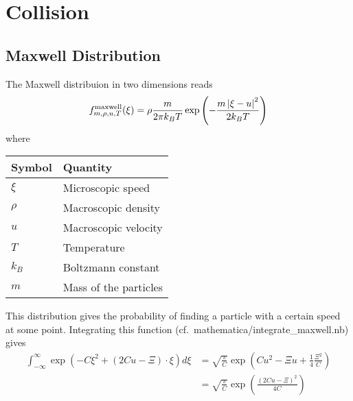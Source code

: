 \documentclass{article}
\begin{document}
\section{Collision}
\label{sec:Collision}

\subsection{Maxwell Distribution}
\label{sub:Maxwell Distribution}
The Maxwell distribuion in two dimensions reads
\begin{equation}
  \label{eq:maxwell distribution raw}
  f_{m, \rho, u, T}^{\text{maxwell}}(\xi) = \rho \frac{m}{2\pi k_B T} \exp \left( - \frac{m\left| \xi-u \right|^2}{2 k_B T}\right)
\end{equation}
where
\begin{center}
  \begin{tabular}{@{}ll@{}}
    \toprule
    Symbol & Quantity  \\
    \midrule
    $\xi$  & Microscopic speed  \\
    $\rho$ & Macroscopic density     \\
    $u$    & Macroscopic velocity   \\
    $T$    & Temperature   \\
    $k_B$  & Boltzmann constant \\
    $m$    & Mass of the particles   \\
    \bottomrule
  \end{tabular}
\end{center}
This distribution gives the probability of finding a particle with a certain speed at some point.
Integrating this function (cf.\ mathematica/integrate\_maxwell.nb) gives
\begin{equation}
  \label{eq:integrate exponential sage}
  \begin{aligned}
    \int_{-\infty}^{\infty} \exp \left(-C \xi^2 + (2Cu - \Xi)\cdot\xi \right) d\xi
    & = \sqrt{\frac{\pi}{C}}\exp \left(Cu^2 - \Xi u + \frac{1}{4} \frac{\Xi^2}{C}\right) \\
    & = \sqrt{\frac{\pi}{C}}\exp \left( \frac{{(2Cu-\Xi)}^2}{4C}\right)
  \end{aligned}
\end{equation}
\end{document}
